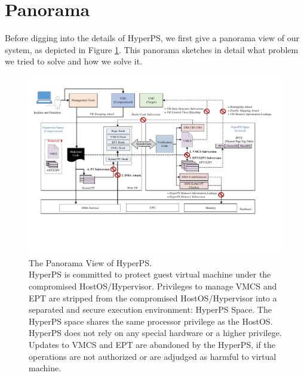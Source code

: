 \section{Panorama} \label{sec:panorama}

Before digging into the details of HyperPS, we first give a panorama view of our system, as depicted in Figure \ref{pic:panorama}. This panorama sketches in detail what problem we tried to solve and how we solve it.

\begin{figure}
    \centering
    \includegraphics[width=1\textwidth]{IMG/panorama.pdf}
    \caption{The Panorama View of HyperPS. \\ HyperPS is committed to protect guest virtual machine under the compromised HostOS/Hypervisor. Privileges to manage VMCS and EPT are stripped from the compromised HostOS/Hypervisor into a separated and secure execution environment: HyperPS Space. The HyperPS space shares the same processor privilege as the HostOS. HyperPS does not rely on any special hardware or a higher privilege. Updates to VMCS and EPT are abandoned by the HyperPS, if the operations are not authorized or are adjudged as harmful to virtual machine.}
    \label{pic:panorama}
\end{figure}

